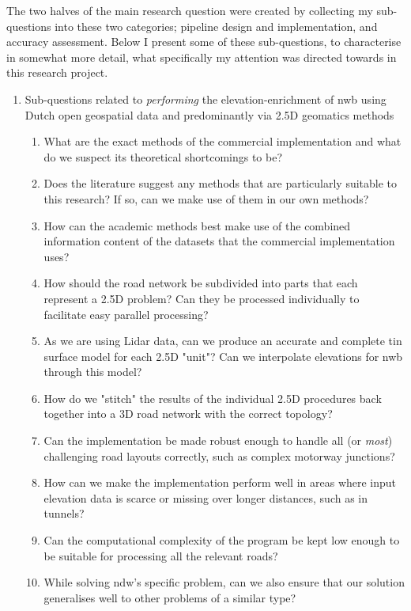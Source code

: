 The two halves of the main research question were created by collecting my sub-questions into these two categories; pipeline design and implementation, and accuracy assessment. Below I present some of these sub-questions, to characterise in somewhat more detail, what specifically my attention was directed towards in this research project. 

\begin{enumerate}
    \item Sub-questions related to \textit{performing} the elevation-enrichment of \ac{nwb} using Dutch open geospatial data and predominantly via 2.5D geomatics methods
    \begin{enumerate}
        \item What are the exact methods of the commercial implementation and what do we suspect its theoretical shortcomings to be?
        \item Does the literature suggest any methods that are particularly suitable to this research? If so, can we make use of them in our own methods?
        \item How can the academic methods best make use of the combined information content of the datasets that the commercial implementation uses?
        \item How should the road network be subdivided into parts that each represent a 2.5D problem? Can they be processed individually to facilitate easy parallel processing?
        \item As we are using Lidar data, can we produce an accurate and complete \ac{tin} surface model for each 2.5D "unit"? Can we interpolate elevations for \ac{nwb} through this model?
        \item How do we "stitch" the results of the individual 2.5D procedures back together into a 3D road network with the correct topology?
        \item Can the implementation be made robust enough to handle all (or \textit{most}) challenging road layouts correctly, such as complex motorway junctions?
        \item How can we make the implementation perform well in areas where input elevation data is scarce or missing over longer distances, such as in tunnels?
        \item Can the computational complexity of the program be kept low enough to be suitable for processing all the relevant roads?
        \item While solving \ac{ndw}'s specific problem, can we also ensure that our solution generalises well to other problems of a similar type?

\end{enumerate}
\end{enumerate}

